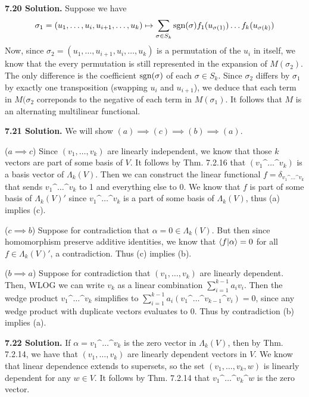 \textbf{7.20 Solution.} Suppose we have 
\[
\sigma_1 = (u_1, \dots, u_i, u_{i+1}, \dots , u_k) \mapsto \sum\limits_{\sigma \in S_k}\text{sgn}(\sigma)f_1(u_{\sigma(1)}) \dots f_k(u_{\sigma(k)})
\]
Now, since $\sigma_2 = (u_1, \dots, u_{i+1}, u_i, \dots, u_k)$ is a permutation of the $u_i$ in itself, we know that the every permutation is still represented in the expansion of $M(\sigma_2)$. The only difference is the coefficient $\text{sgn}(\sigma)$ of each $\sigma \in S_k$. Since $\sigma_2$ differs by $\sigma_1$ by exactly one transposition (swapping $u_i$ and $u_{i+1}$), we deduce that each term in $M(\sigma_2$ correponds to the negative of each term in $M(\sigma_1)$. It follows that $M$ is an alternating multilinear functional.

\textbf{7.21 Solution.} We will show $(a) \implies (c) \implies (b) \implies (a)$.

($a \implies c$) Since $(v_1, \dots, v_k)$ are linearly independent, we know that those $k$ vectors are part of some basis of $V$. It follows by Thm. 7.2.16 that $(v_1 \^ \dots \^ v_k)$ is a basis vector of $\Lambda_k(V)$. Then we can construct the linear functional $f = \delta_{v_1 \^ \dots \^ v_k}$ that sends $v_1 \^ \dots \^ v_k$ to 1 and everything else to 0. We know that $f$ is part of some basis of $\Lambda_k(V)'$ since $v_1 \^ \dots \^ v_k$ is a part of some basis of $\Lambda_k(V)$, thus (a) implies (c).

($c \implies b$) Suppose for contradiction that $\alpha = 0 \in \Lambda_k(V)$. But then since homomorphism preserve additive identities, we know that $\langle f | \alpha\rangle = 0$ for all $f \in \Lambda_k(V)'$, a contradiction. Thus (c) implies (b).

($b \implies a$) Suppose for contradiction that $(v_1, \dots, v_k)$ are linearly dependent. Then, WLOG we can write $v_k$ as a linear combination $\sum_{i = 1}^{k - 1}a_iv_i$. Then the wedge product $v_1 \^ \dots \^ v_k$ simplifies to $\sum_{i = 1}^{k - 1}a_i(v_1 \^ \dots \^ v_{k-1} \^ v_i) = 0$, since any wedge product with duplicate vectors evaluates to 0. Thus by contradiction (b) implies (a).

\textbf{7.22 Solution.} If $\alpha = v_1 \^ \dots \^ v_k$ is the zero vector in $\Lambda_k(V)$, then by Thm. 7.2.14, we have that $(v_1, \dots, v_k)$ are linearly dependent vectors in $V$. We know that linear dependence extends to supersets, so the set $(v_1, \dots, v_k, w)$ is linearly dependent for any $w \in V$. It follows by Thm. 7.2.14 that $v_1 \^ \dots \^ v_k \^ w$ is the zero vector.

